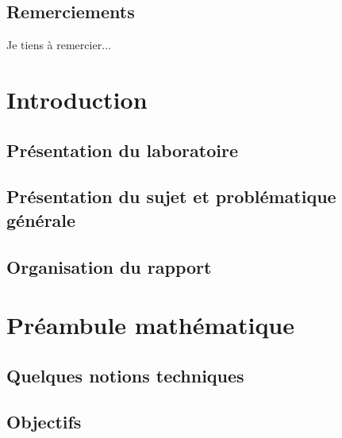 \documentclass[11pt]{report}
\theoremstyle{definition}
\theoremstyle{remark}
\begin{document}
\newpage
\thispagestyle{empty}
\mbox{}

\newpage
\section*{Remerciements}

Je tiens à remercier...
\newpage

\tableofcontents

\newpage

\listoffigures
{}

\newpage

\listoftables
{}

\newpage

\newpage
\chapter{Introduction}
\section{Présentation du laboratoire}

\section{Présentation du sujet et problématique générale}

\section{Organisation du rapport}


\newpage
\chapter{Préambule mathématique}
    \label{par:tech}
    
    \newpage
    \section{Quelques notions techniques}
    
    \newpage
    \section{Objectifs}
    
\end{document}
